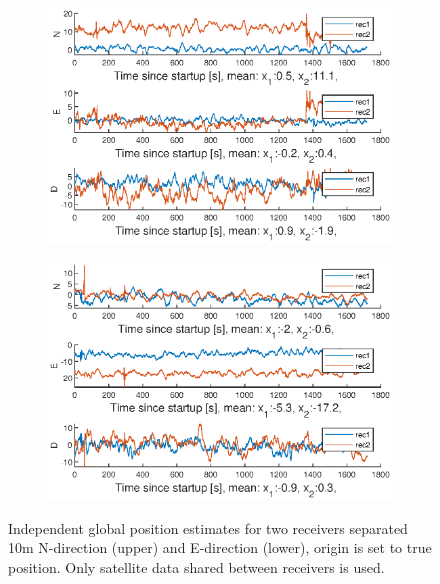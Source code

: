 \begin{figure}[H]
\begin{subfigure}{\textwidth}
\includegraphics[width=1\textwidth]{Results/DistNED30MinNSharedSat}
\end{subfigure}
\begin{subfigure}{\textwidth}
\includegraphics[width=1\textwidth]{Results/DistNED30MinESharedSats}
\end{subfigure}
\caption{\label{fig:globalPosSelectSV} Independent global position estimates for two receivers separated 10m N-direction (upper) and E-direction (lower), origin is set to true position. Only satellite data shared between receivers is used.}
\end{figure}

